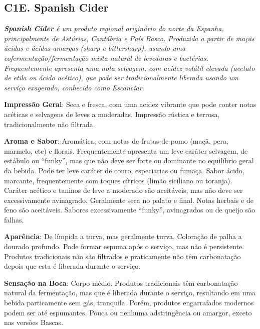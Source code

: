 \subsection*{C1E. Spanish Cider}

\textit{\textbf{Spanish Cider} é um produto regional originário do norte da Espanha, principalmente de Astúrias, Cantábria e País Basco. Produzida a partir de maçãs ácidas e ácidas-amargas (\textit{sharp} e \textit{bittersharp}), usando uma cofermentação/fermentação mista natural de leveduras e bactérias. Frequentemente apresenta uma nota selvagem, com acidez volátil elevada (acetato de etila ou ácido acético), que pode ser tradicionalmente liberada usando um serviço exagerado, conhecido como \textit{Escanciar}.}

\textbf{Impressão Geral}: Seca e fresca, com uma acidez vibrante que pode conter notas acéticas e selvagens de leves a moderadas. Impressão rústica e terrosa, tradicionalmente não filtrada.

\textbf{Aroma e Sabor}: Aromática, com notas de frutas-de-pomo (maçã, pera, marmelo, etc) e florais. Frequentemente apresenta um leve caráter selvagem, de estábulo ou “funky”, mas que não deve ser forte ou dominante no equilíbrio geral da bebida. Pode ter leve caráter de couro, especiarias ou fumaça. Sabor ácido, marcante, frequentemente com toques cítricos (limão siciliano ou toranja). Caráter acético e taninos de leve a moderado são aceitáveis, mas não deve ser excessivamente avinagrado. Geralmente seca no palato e final. Notas herbais e de feno são aceitáveis. Sabores excessivamente “funky”, avinagrados ou de queijo são falhas.

\textbf{Aparência}: De límpida a turva, mas geralmente turva. Coloração de palha a dourado profundo. Pode formar espuma após o serviço, mas não é persistente. Produtos tradicionais não são filtrados e praticamente não têm carbonatação depois que esta é liberada durante o serviço.

\textbf{Sensação na Boca}: Corpo médio. Produtos tradicionais têm carbonatação natural da fermentação, mas que é liberada durante o serviço, resultando em uma bebida particamente sem gás, tranquila. Porém, produtos engarrafados modernos podem ser até espumantes. Pouca ou nenhuma adstringência ou amargor, exceto nas versões Bascas.


